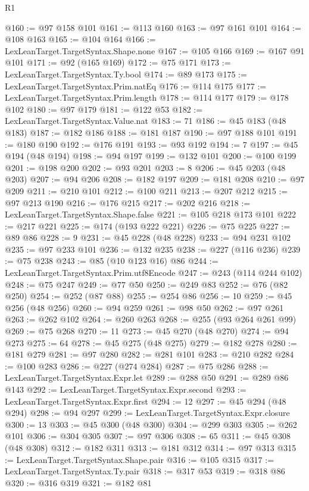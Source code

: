 \begin{lexlean}{R1}
\begin{coremodule}
@160 := @97 @158 @101
@161 := @113 @160
@163 := @97 @161 @101
@164 := @108 @163
@165 := @104 @164
@166 := LexLeanTarget.TargetSyntax.Shape.none
@167 := @105 @166
@169 := @167 @91 @101
@171 := @92 (@165 @169)
@172 := @75 @171
@173 := LexLeanTarget.TargetSyntax.Ty.bool
@174 := @89 @173
@175 := LexLeanTarget.TargetSyntax.Prim.natEq
@176 := @114 @175
@177 := LexLeanTarget.TargetSyntax.Prim.length
@178 := @114 @177
@179 := @178 @102
@180 := @97 @179
@181 := @122 @53
@182 := LexLeanTarget.TargetSyntax.Value.nat
@183 := 71
@186 := @45 @183 (@48 @183)
@187 := @182 @186
@188 := @181 @187
@190 := @97 @188 @101
@191 := @180 @190
@192 := @176 @191
@193 := @93 @192
@194 := 7
@197 := @45 @194 (@48 @194)
@198 := @94 @197
@199 := @132 @101
@200 := @100 @199
@201 := @198 @200
@202 := @93 @201
@203 := 8
@206 := @45 @203 (@48 @203)
@207 := @94 @206
@208 := @182 @197
@209 := @181 @208
@210 := @97 @209
@211 := @210 @101
@212 := @100 @211
@213 := @207 @212
@215 := @97 @213 @190
@216 := @176 @215
@217 := @202 @216
@218 := LexLeanTarget.TargetSyntax.Shape.false
@221 := @105 @218 @173 @101
@222 := @217 @221
@225 := @174 (@193 @222 @221)
@226 := @75 @225
@227 := @89 @86
@228 := 9
@231 := @45 @228 (@48 @228)
@233 := @94 @231 @102
@235 := @97 @233 @101
@236 := @132 @235
@238 := @227 (@116 @236)
@239 := @75 @238
@243 := @85 (@10 @123 @16) @86
@244 := LexLeanTarget.TargetSyntax.Prim.utf8Encode
@247 := @243 (@114 @244 @102)
@248 := @75 @247
@249 := @77 @50
@250 := @249 @83
@252 := @76 (@82 @250)
@254 := @252 (@87 @88)
@255 := @254 @86
@256 := 10
@259 := @45 @256 (@48 @256)
@260 := @94 @259
@261 := @98 @50
@262 := @97 @261
@263 := @262 @102
@264 := @260 @263
@268 := @255 (@93 @264 @261 @99)
@269 := @75 @268
@270 := 11
@273 := @45 @270 (@48 @270)
@274 := @94 @273
@275 := 64
@278 := @45 @275 (@48 @275)
@279 := @182 @278
@280 := @181 @279
@281 := @97 @280
@282 := @281 @101
@283 := @210 @282
@284 := @100 @283
@286 := @227 (@274 @284)
@287 := @75 @286
@288 := LexLeanTarget.TargetSyntax.Expr.let
@289 := @288 @50
@291 := @289 @86 @143
@292 := LexLeanTarget.TargetSyntax.Expr.second
@293 := LexLeanTarget.TargetSyntax.Expr.first
@294 := 12
@297 := @45 @294 (@48 @294)
@298 := @94 @297
@299 := LexLeanTarget.TargetSyntax.Expr.closure
@300 := 13
@303 := @45 @300 (@48 @300)
@304 := @299 @303
@305 := @262 @101
@306 := @304 @305
@307 := @97 @306
@308 := 65
@311 := @45 @308 (@48 @308)
@312 := @182 @311
@313 := @181 @312
@314 := @97 @313
@315 := LexLeanTarget.TargetSyntax.Shape.pair
@316 := @105 @315
@317 := LexLeanTarget.TargetSyntax.Ty.pair
@318 := @317 @53
@319 := @318 @86
@320 := @316 @319
@321 := @182 @81

\end{coremodule}
\end{lexlean}
